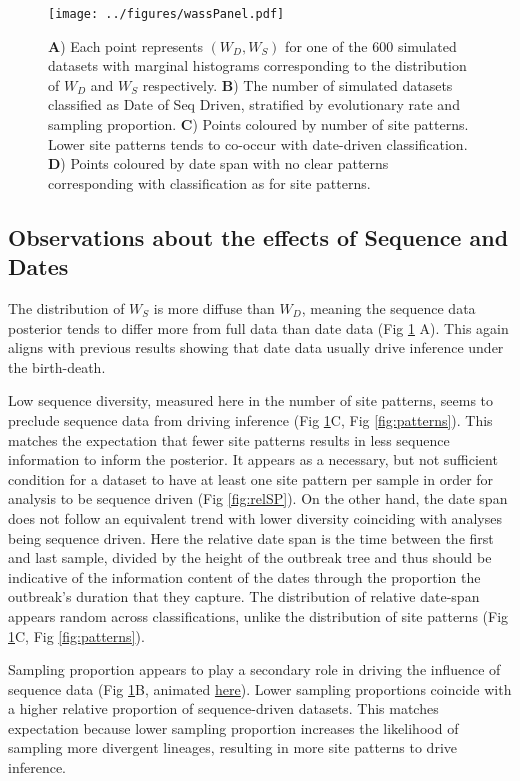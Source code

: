 \documentclass{article}
\begin{document}
\begin{figure}[H]
\centering
\texttt{[image: ../figures/wassPanel.pdf]}
\caption{\textbf{A}) Each point represents $(W_D, W_S)$ for one of the 600 simulated datasets with marginal histograms corresponding to the distribution of $W_D$ and $W_S$ respectively. \textbf{B}) The number of simulated datasets classified as Date of Seq Driven, stratified by evolutionary rate and sampling proportion. \textbf{C}) Points coloured by number of site patterns. Lower site patterns tends to co-occur with date-driven classification. \textbf{D}) Points coloured by date span with no clear patterns corresponding with classification as for site patterns. }
\label{fig:wData}
\end{figure}

\subsection*{Observations about the effects of Sequence and Dates}
The distribution of $W_S$ is more diffuse than $W_D$, meaning the sequence data posterior tends to differ more from full data than date data (Fig \ref{fig:wData} A). This again aligns with previous results showing that date data usually drive inference under the birth-death.

Low sequence diversity, measured here in the number of site patterns, seems to preclude sequence data from driving inference (Fig \ref{fig:wData}C, Fig \ref{fig:patterns}). This matches the expectation that fewer site patterns results in less sequence information to inform the posterior. It appears as a necessary, but not sufficient condition for a dataset to have at least one site pattern per sample in order for analysis to be sequence driven (Fig \ref{fig:relSP}). On the other hand, the date span  does not follow an equivalent trend with lower diversity coinciding with analyses being sequence driven. Here the relative date span is the time between the first and last sample, divided by the height of the outbreak tree and thus should be indicative of the information content of the dates through the proportion the outbreak's duration that they capture. The distribution of relative date-span appears random across classifications, unlike the distribution of site patterns (Fig \ref{fig:wData}C, Fig \ref{fig:patterns}).

Sampling proportion appears to play a secondary role in driving the influence of sequence data (Fig \ref{fig:wData}B, animated \href{https://github.com/LeoFeatherstone/phyloDataSignal/blob/main/figures/wassTraj.gif}{\underline{here}}). Lower sampling proportions coincide with a higher relative proportion of sequence-driven datasets. This matches expectation because lower sampling proportion increases the likelihood of sampling more divergent lineages, resulting in more site patterns to drive inference.
\end{document}
